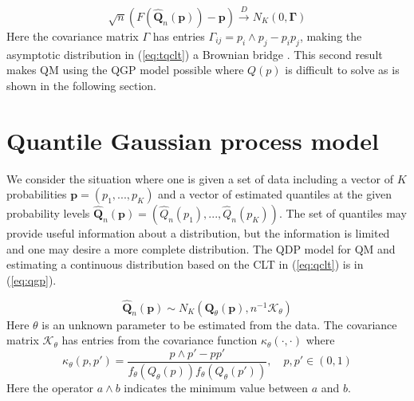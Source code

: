 \documentclass[preprint,12pt,authoryear]{elsarticle}
\begin{document}
\begin{equation}
    \label{eq:tqclt}
    \sqrt{n}(F(\hat{\boldsymbol{Q}}_n(\boldsymbol{p})) - \boldsymbol{p}) \overset{D}{\rightarrow} N_K(0, \boldsymbol{\Gamma})
\end{equation}
Here the covariance matrix $\Gamma$ has entries $\Gamma_{ij} = p_i \wedge p_j - p_i p_j$, making the asymptotic distribution in (\ref{eq:tqclt}) a Brownian bridge \cite[]{chow2009brownian}. This second result makes QM using the QGP model possible where $Q(p)$ is difficult to solve as is shown in the following section.




\section{Quantile Gaussian process model} \label{sec:qgp_model}

We consider the situation where one is given a set of data including a vector of $K$ probabilities $\boldsymbol{p} = (p_1, ..., p_K)$ and a vector of estimated quantiles at the given probability levels $\hat{\boldsymbol{Q}}_n(\boldsymbol{p}) = (\hat{Q}_n(p_1), ..., \hat{Q}_n(p_K))$. 
The set of quantiles may provide useful information about a distribution, but the information is limited and one may desire a more complete distribution.
The QDP model for QM and estimating a continuous distribution based on the CLT in (\ref{eq:qclt}) is in (\ref{eq:qgp}).



\begin{equation}
    \label{eq:qgp}
\hat{\boldsymbol{Q}}_n(\boldsymbol{p}) \sim N_K(\boldsymbol{Q}_{\theta}(\boldsymbol{p}), n^{-1} \boldsymbol{\mathcal{K}}_{\theta})
\end{equation}
Here $\theta$ is an unknown parameter to be estimated from the data. The covariance matrix $\boldsymbol{\mathcal{K}}_{\theta}$ has entries from the covariance function $\kappa_{\theta}(\cdot, \cdot)$ where 
\[
\kappa_{\theta}(p, p') = \frac{p\wedge p' - p p'}{f_{\theta}(Q_{\theta}(p)) f_{\theta}(Q_{\theta}(p'))}, \quad p, p' \in (0,1)
\]
Here the operator $a\wedge b$ indicates the minimum value between $a$ and $b$.
\end{document}
